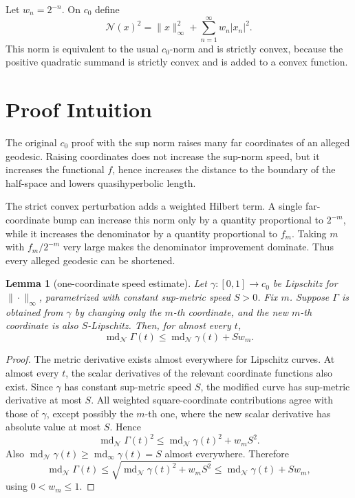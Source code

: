 \documentclass[11pt]{article}
\newtheorem{lemma}{Lemma}
\newcommand{\N}{\mathcal N}
\newcommand{\md}{\operatorname{md}}
\begin{document}
Let \(w_n=2^{-n}\).  On \(c_0\) define
\[
  \N(x)^2=\|x\|_\infty^2+\sum_{n=1}^{\infty}w_n|x_n|^2.
\]
This norm is equivalent to the usual \(c_0\)-norm and is strictly convex, because the positive quadratic summand is strictly convex and is added to a convex function.

\section*{Proof Intuition}

The original \(c_0\) proof with the sup norm raises many far coordinates of an alleged geodesic.  Raising coordinates does not increase the sup-norm speed, but it increases the functional \(f\), hence increases the distance to the boundary of the half-space and lowers quasihyperbolic length.

The strict convex perturbation adds a weighted Hilbert term.  A single far-coordinate bump can increase this norm only by a quantity proportional to \(2^{-m}\), while it increases the denominator by a quantity proportional to \(f_m\).  Taking \(m\) with \(f_m/2^{-m}\) very large makes the denominator improvement dominate.  Thus every alleged geodesic can be shortened.

\begin{lemma}[one-coordinate speed estimate]\label{lem:speed}
Let \(\gamma:[0,1]\to c_0\) be Lipschitz for \(\|\cdot\|_\infty\), parametrized with constant sup-metric speed \(S>0\).  Fix \(m\).  Suppose \(\Gamma\) is obtained from \(\gamma\) by changing only the \(m\)-th coordinate, and the new \(m\)-th coordinate is also \(S\)-Lipschitz.  Then, for almost every \(t\),
\[
  \md_{\N}\Gamma(t)\le \md_{\N}\gamma(t)+S w_m.
\]
\end{lemma}

\begin{proof}
The metric derivative exists almost everywhere for Lipschitz curves.  At almost every \(t\), the scalar derivatives of the relevant coordinate functions also exist.  Since \(\gamma\) has constant sup-metric speed \(S\), the modified curve has sup-metric derivative at most \(S\).  All weighted square-coordinate contributions agree with those of \(\gamma\), except possibly the \(m\)-th one, where the new scalar derivative has absolute value at most \(S\).  Hence
\[
  \md_{\N}\Gamma(t)^2\le \md_{\N}\gamma(t)^2+w_mS^2.
\]
Also \(\md_{\N}\gamma(t)\ge \md_{\infty}\gamma(t)=S\) almost everywhere.  Therefore
\[
  \md_{\N}\Gamma(t)
  \le \sqrt{\md_{\N}\gamma(t)^2+w_mS^2}
  \le \md_{\N}\gamma(t)+S w_m,
\]
using \(0<w_m\le 1\). 
\end{proof}
\end{document}
